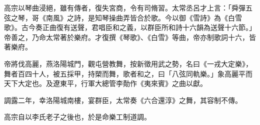 \begin{pinyinscope}
 高宗以琴曲浸絕，雖有傳者，復失宮商，令有司脩習。太常丞呂才上言：「舜彈五弦之琴，哥《南風》之詩，是知琴操曲弄皆合於歌。今以御《雪詩》為《白雪歌》。古今奏正曲復有送聲，君唱臣和之義，以群臣所和詩十六韻為送聲十六節。」帝善之，乃命太常著於樂府。才復撰《琴歌》、《白雪》等曲，帝亦制歌詞十六，皆著樂府。



 帝將伐高麗，燕洛陽城門，觀屯營教舞，按新徵用武之勢，名曰《一戎大定樂》，舞者百四十人，被五採甲，持槊而舞，歌者和之，曰「八弦同軌樂。」象高麗平而天下大定也。及遼東平，行軍大總管李勣作《夷來賓》之曲以獻。



 調露二年，幸洛陽城南樓，宴群臣，太常奏《六合還淳》之舞，其容制不傳。



 高宗自以李氏老子之後也，於是命樂工制道調。



\end{pinyinscope}